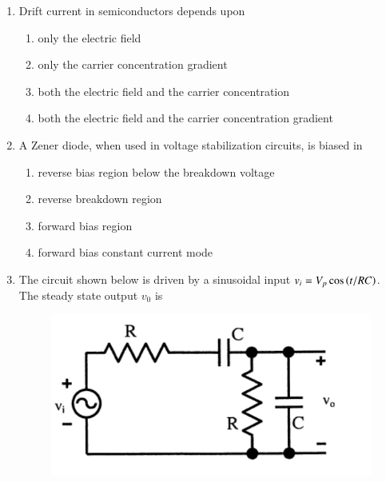 \documentclass[a4paper, 11pt]{article}
\begin{document}
\begin{enumerate}
    \hfill{}

    \item Drift current in semiconductors depends upon
    
    \begin{enumerate}
        \item only the electric field
        \item only the carrier concentration gradient
        \item both the electric field and the carrier concentration
        \item both the electric field and the carrier concentration gradient
    \end{enumerate}

    \hfill{}

    \item A Zener diode, when used in voltage stabilization circuits, is biased in
    
    \begin{enumerate}
        \item reverse bias region below the breakdown voltage
        \item reverse breakdown region
        \item forward bias region
        \item forward bias constant current mode
    \end{enumerate}

    \hfill{}

    \item The circuit shown below is driven by a sinusoidal input $v_{i}=V_{p}\cos\left(t/RC\right)$. The steady state output $v_{0}$ is
    
    \begin{figure}[H]
        \centering
        \includegraphics[width=0.6\columnwidth]{figs/q23.png}
        \caption*{}
        \label{fig:q23}
    \end{figure}
    
    \begin{enumerate}
    \end{enumerate}


\end{enumerate}
\end{document}
